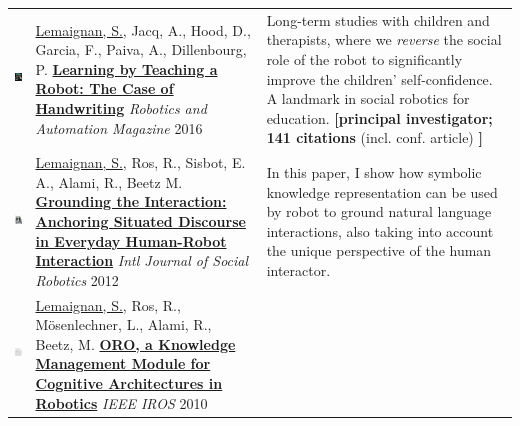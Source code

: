 \documentclass[11pt,a4paper]{report}
\begin{document}
\begin{tabular}{p{1.7cm}p{7cm}p{8cm}}
    \vspace{-.20cm}\includegraphics[height=2.2cm]{thumbs/2016-cowriter.jpg} &

    \underline{Lemaignan, S.}, Jacq, A., Hood, D., Garcia, F., Paiva, A., Dillenbourg, P.
    \newline
    \href{https://doi.org/10.1109/MRA.2016.2546700}{\textbf{Learning by
    Teaching a Robot: The Case of Handwriting}}
    \newline \textit{Robotics and Automation Magazine} 2016
    & \small Long-term studies with children and
    therapists, where we \emph{reverse} the social role of the
    robot to significantly improve the children' self-confidence. A landmark in
    social robotics for education. \textbf{\newline[principal investigator; 141
    citations} (incl. conf. article) \textbf{]}\\


    \vspace{-.20cm}\includegraphics[height=2.2cm]{thumbs/2012-grounding.jpg} &

    \underline{Lemaignan, S.}, Ros, R., Sisbot, E. A., Alami, R., Beetz M.
    \href{https://doi.org/10.1007/s12369-011-0123-x}{\textbf{Grounding
    the Interaction: Anchoring Situated Discourse in Everyday Human-Robot
    Interaction}} 
    \newline \textit{Intl Journal of Social Robotics} 2012

    & \small In this paper, I show how symbolic knowledge representation can be
    used by robot to ground natural language interactions, also taking into
    account the unique perspective of the human interactor.
    \textbf{}\\

    \vspace{-.20cm}\includegraphics[height=2.2cm]{thumbs/2010-oro.jpg} &
    \underline{Lemaignan, S.}, Ros, R., Mösenlechner, L., Alami, R., Beetz, M.
    \newline\href{https://doi.org/10.1109/IROS.2010.5649547}{\textbf{ORO, a Knowledge Management Module for Cognitive Architectures in
    Robotics}}
    \newline \textit{IEEE IROS} 2010


\end{tabular}
\end{document}
